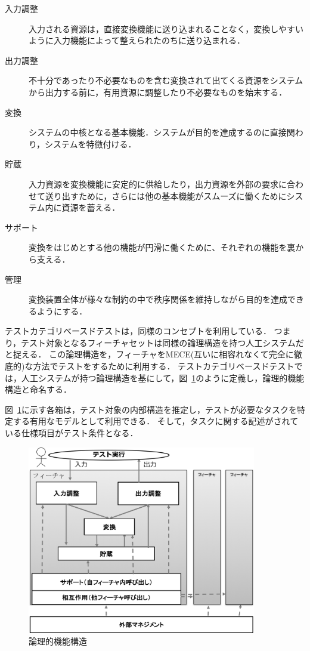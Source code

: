 \begin{description}
  \item[入力調整]入力される資源は，直接変換機能に送り込まれることなく，変換しやすいように入力機能によって整えられたのちに送り込まれる．
  \item[出力調整]不十分であったり不必要なものを含む変換されて出てくる資源をシステムから出力する前に，有用資源に調整したり不必要なものを始末する．
  \item[変換]システムの中核となる基本機能．システムが目的を達成するのに直接関わり，システムを特徴付ける．
  \item[貯蔵]入力資源を変換機能に安定的に供給したり，出力資源を外部の要求に合わせて送り出すために，さらには他の基本機能がスムーズに働くためにシステム内に資源を蓄える．
  \item[サポート]変換をはじめとする他の機能が円滑に働くために、それぞれの機能を裏から支える．
  \item[管理]変換装置全体が様々な制約の中で秩序関係を維持しながら目的を達成できるようにする．
\end{description}


テストカテゴリベースドテストは，同様のコンセプトを利用している．
つまり，テスト対象となるフィーチャセットは同様の論理構造を持つ人工システムだと捉える．
この論理構造を，フィーチャをMECE(互いに相容れなくて完全に徹底的)\cite{ethan1999mckinsey}な方法でテストをするために利用する．
テストカテゴリベースドテストでは，人工システムが持つ論理構造を基にして，図~\ref{fig:D-3-Fig3}のように定義し，論理的機能構造と命名する．

図~\ref{fig:D-3-Fig3}に示す各箱は，テスト対象の内部構造を推定し，テストが必要なタスクを特定する有用なモデルとして利用できる．
そして，タスクに関する記述がされている仕様項目がテスト条件となる．
\begin{figure}[htbp]
  \begin{center}
	\includegraphics[width=10cm]{./image/D-3-Fig3.png}
	\caption{論理的機能構造}
	\label{fig:D-3-Fig3}
  \end{center}
\end{figure}

